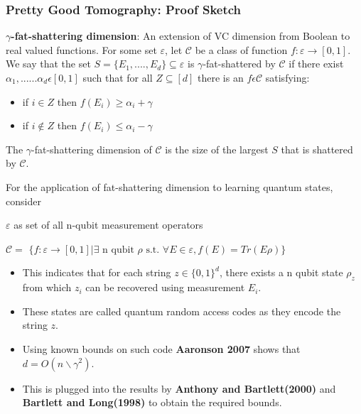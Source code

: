 \documentclass{beamer}
\begin{document}
\begin{frame}
\frametitle{Pretty Good Tomography: Proof Sketch}
\textbf{$\gamma$-fat-shattering dimension}: An extension of VC dimension from Boolean to real valued functions. For some set $\varepsilon$, let $\mathcal{C}$ be a class of function $f: \varepsilon \rightarrow [0,1]$. We say that the set $S = \{E_1,....,E_d\} \subseteq \varepsilon$ is $\gamma$-fat-shattered by $\mathcal{C}$ if there exist $\alpha_1,......\alpha_d  \epsilon  [0,1]$ such that for all $Z \subseteq [d]$ there is an $f \epsilon \mathcal{C}$ satisfying:

\begin{itemize}
\item if $i \in Z$ then $f(E_i)\geq \alpha_i + \gamma$
\item if $i \not\in Z$ then $f(E_i)\leq \alpha_i - \gamma$
\end{itemize}

The $\gamma$-fat-shattering dimension of $\mathcal{C}$ is the size of the largest $S$ that is shattered by $\mathcal{C}$. 
\end{frame}

For the application of fat-shattering dimension to learning quantum states, consider

\begin{center}
$\varepsilon$ as set of all n-qubit measurement operators

$\mathcal{C} =$ $\{f : \varepsilon \rightarrow [0,1] | \exists \text{ n qubit } \rho \text{ s.t. } \forall E \in \varepsilon, f(E) = {Tr}(E\rho)\}$

\end{center}

\begin{itemize}

\item This indicates that for each string $z \in \{0,1\}^d$, there exists a n qubit state $\rho_z$ from which $z_i$ can be recovered using measurement $E_i$.

\item These states are called quantum random access codes as they encode the string $z$.

\item Using known bounds on such code \textbf{Aaronson 2007} shows that $d = O(n \backslash\gamma^2)$.

\item This is plugged into the results by \textbf{Anthony and Bartlett(2000)} and \textbf{Bartlett and Long(1998)} to obtain the required bounds.

\end{itemize}
\end{document}
